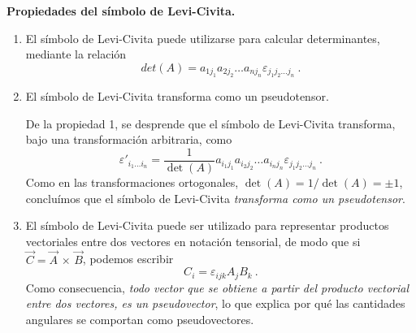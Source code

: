 
\begin{propiedad}
    \textbf{Propiedades del símbolo de Levi-Civita.}

    \begin{enumerate}
        \item El símbolo de Levi-Civita puede utilizarse para calcular determinantes, mediante la relación
        \begin{equation}
            det(A) = a_{1 j_1} a_{2 j_2} \dots a_{n j_n} \varepsilon_{j_1 j_2 \dots j_n} \ .
        \end{equation}

        \item El símbolo de Levi-Civita transforma como un pseudotensor.
        
        De la propiedad 1, se desprende que el símbolo de Levi-Civita transforma, bajo una transformación arbitraria, como
        \begin{equation}
            \varepsilon'_{i_1 \dots i_n} = \frac{1}{\det(A)} a_{i_1 j_1} a_{i_2 j_2} \dots a_{i_n j_n} \varepsilon_{j_1 j_2 \dots j_n} \ .
        \end{equation}
        Como en las transformaciones ortogonales, $\det(A) = 1/\det(A) = \pm 1$, concluímos que el símbolo de Levi-Civita \emph{transforma como un pseudotensor}.

        \item El símbolo de Levi-Civita puede ser utilizado para representar productos vectoriales entre dos vectores en notación tensorial, de modo que si $\vec{C} = \vec{A} \, \times \, \vec{B}$, podemos escribir
        \begin{equation}
            C_i = \varepsilon_{ijk} A_j B_k \ .
        \end{equation}
        Como consecuencia, \emph{todo vector que se obtiene a partir del producto vectorial entre dos vectores, es un pseudovector}, lo que explica por qué las cantidades angulares se comportan como pseudovectores.


\end{enumerate}
\end{propiedad}
